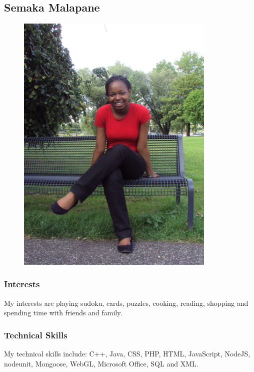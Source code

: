 \documentclass[hidelinks, 12pt, oneside]{article}
\begin{document}
\subsection{Semaka Malapane}

\begin{figure}[ht!]
  \centering
    \includegraphics[width=0.85\textwidth]{Semaka} 
\end{figure}

\subsubsection{Interests}

My interests are playing sudoku, cards, puzzles, cooking, reading, shopping and spending time with friends and family.

\subsubsection{Technical Skills}

My technical skills include: C++, Java, CSS, PHP, HTML, JavaScript, NodeJS, nodeunit, Mongoose, WebGL, Microsoft Office, SQL and XML.
 
\end{document}
